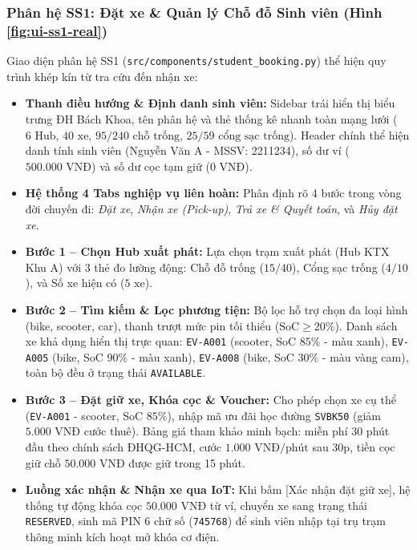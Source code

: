 \documentclass[12pt,a4paper]{article}
\begin{document}
\subsubsection{Phân hệ SS1: Đặt xe \& Quản lý Chỗ đỗ Sinh viên (Hình \ref{fig:ui-ss1-real})}
Giao diện phân hệ SS1 (\texttt{src/components/student\_booking.py}) thể hiện quy trình khép kín từ tra cứu đến nhận xe:
\begin{itemize}[nosep]
    \item \textbf{Thanh điều hướng \& Định danh sinh viên:} Sidebar trái hiển thị biểu trưng ĐH Bách Khoa, tên phân hệ và thẻ thống kê nhanh toàn mạng lưới ($6\text{ Hub}$, $40\text{ xe}$, $95/240\text{ chỗ trống}$, $25/59\text{ cổng sạc trống}$). Header chính thể hiện danh tính sinh viên (Nguyễn Văn A - MSSV: 2211234), số dư ví ($500.000\text{ VNĐ}$) và số dư cọc tạm giữ ($0\text{ VNĐ}$).
    \item \textbf{Hệ thống 4 Tabs nghiệp vụ liên hoàn:} Phân định rõ 4 bước trong vòng đời chuyến đi: \textit{Đặt xe}, \textit{Nhận xe (Pick-up)}, \textit{Trả xe \& Quyết toán}, và \textit{Hủy đặt xe}.
    \item \textbf{Bước 1 -- Chọn Hub xuất phát:} Lựa chọn trạm xuất phát (Hub KTX Khu A) với 3 thẻ đo lường động: Chỗ đỗ trống ($15/40$), Cổng sạc trống ($4/10$), và Số xe hiện có ($5\text{ xe}$).
    \item \textbf{Bước 2 -- Tìm kiếm \& Lọc phương tiện:} Bộ lọc hỗ trợ chọn đa loại hình (bike, scooter, car), thanh trượt mức pin tối thiểu ($\text{SoC} \ge 20\%$). Danh sách xe khả dụng hiển thị trực quan: \texttt{EV-A001} (scooter, SoC $85\%$ - màu xanh), \texttt{EV-A005} (bike, SoC $90\%$ - màu xanh), \texttt{EV-A008} (bike, SoC $30\%$ - màu vàng cam), toàn bộ đều ở trạng thái \texttt{AVAILABLE}.
    \item \textbf{Bước 3 -- Đặt giữ xe, Khóa cọc \& Voucher:} Cho phép chọn xe cụ thể (\texttt{EV-A001} - scooter, SoC $85\%$), nhập mã ưu đãi học đường \texttt{SVBK50} (giảm $5.000\text{ VNĐ}$ cước thuê). Bảng giá tham khảo minh bạch: miễn phí 30 phút đầu theo chính sách ĐHQG-HCM, cước $1.000\text{ VNĐ/phút}$ sau 30p, tiền cọc giữ chỗ $50.000\text{ VNĐ}$ được giữ trong 15 phút.
    \item \textbf{Luồng xác nhận \& Nhận xe qua IoT:} Khi bấm [Xác nhận đặt giữ xe], hệ thống tự động khóa cọc $50.000\text{ VNĐ}$ từ ví, chuyển xe sang trạng thái \texttt{RESERVED}, sinh mã PIN 6 chữ số (\texttt{745768}) để sinh viên nhập tại trụ trạm thông minh kích hoạt mở khóa cơ điện.
\end{itemize}
\end{document}
